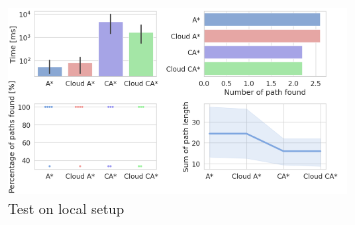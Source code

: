 \begin{figure}[H]
    \centering
    \includegraphics[width=0.8\textwidth]{pictures/local_test_rest.png}
    \caption{Test on local setup}
    \label{fig:local_test_rest}
\end{figure}